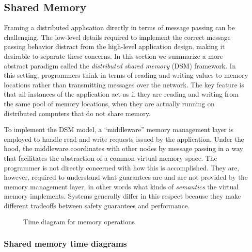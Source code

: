 \documentclass[]             %
{NASA}                       %
\theoremstyle{definition}
\begin{document}


\newpage
\subsection{Shared Memory}
Framing a distributed application directly in terms of message passing
can be challenging. The low-level details required to implement the
correct message passing behavior distract from the high-level
application design, making it desirable to separate these concerns. In
this section we summarize a more abstract paradigm called the
\emph{distributed shared memory} (DSM) framework. In this setting,
programmers think in terms of reading and writing values to memory
locations rather than transmitting messages over the network. The key
feature is that all instances of the application act as if they are
reading and writing from the same pool of memory locations, when they
are actually running on distributed computers that do not share
memory.

To implement the DSM model, a ``middleware'' memory management layer
is employed to handle read and write requests issued by the
application. Under the hood, the middleware coordinates with other
nodes by message passing in a way that facilitates the abstraction of
a common virtual memory space. The programmer is not directly
concerned with how this is accomplished. They are, however, required
to understand what guarantees are and are not provided by the memory
management layer, in other words what kinds of \emph{semantics} the
virtual memory implements. Systems generally differ in this respect
because they make different tradeoffs between safety guarantees and
performance.

\begin{figure}
    \centering
    
    \caption{Time diagram for memory operations}
    \label{fig:smEx1}
\end{figure}

\subsubsection{Shared memory time diagrams}
\newcommand{\Op}{\mathrm{Op}}
\end{document}
